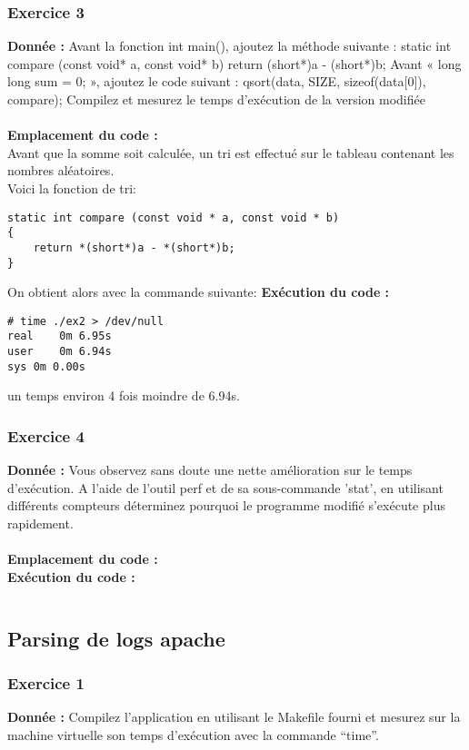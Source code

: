 \subsubsection{Exercice 3}
\textbf{Donnée : } Avant	la	fonction	int	main(),	ajoutez	la	méthode	suivante :
static int compare (const void* a, const void* b)
{return (short*)a - (short*)b;}
Avant	« long	long	sum	=	0; »,	ajoutez	le	code	suivant :
qsort(data, SIZE, sizeof(data[0]), compare);
Compilez	et	mesurez	le	temps	d'exécution	de	la	version	modifiée\\\\
\textbf{Emplacement du code : } \textit{}\\
Avant que la somme soit calculée, un tri est effectué sur le tableau contenant les nombres aléatoires.\\
Voici la fonction de tri:
\begin{lstlisting}
static int compare (const void * a, const void * b)
{
    return *(short*)a - *(short*)b;
}
\end{lstlisting}
On obtient alors avec la commande suivante:
\textbf{Exécution du code : } \\
\begin{lstlisting}
# time ./ex2 > /dev/null 
real    0m 6.95s
user    0m 6.94s
sys 0m 0.00s
\end{lstlisting}
un temps environ 4 fois moindre de 6.94s.

\subsubsection{Exercice 4}
\textbf{Donnée : } Vous	observez	sans	doute	une	nette	amélioration	sur	le	temps	d'exécution.
A	l'aide	de	l'outil	perf	et	de	sa	sous-commande	'stat',	en	utilisant	différents	compteurs	déterminez	
pourquoi	le	programme	modifié	s'exécute	plus	rapidement.\\\\
\textbf{Emplacement du code : } \textit{}\\

\textbf{Exécution du code : } \\
\begin{lstlisting}

\end{lstlisting}

\subsection{Parsing de logs apache}
\subsubsection{Exercice 1}
\textbf{Donnée : } Compilez	l'application	en	utilisant	le	Makefile	fourni	et	mesurez sur	la	machine	virtuelle son	temps	
d'exécution	avec	la	commande	“time”.\\\\

